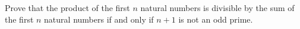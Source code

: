 Prove that the product of the first $ n$ natural numbers is divisible by the sum of the first $ n$ natural numbers if and only if $ n+1$ is not an odd prime.